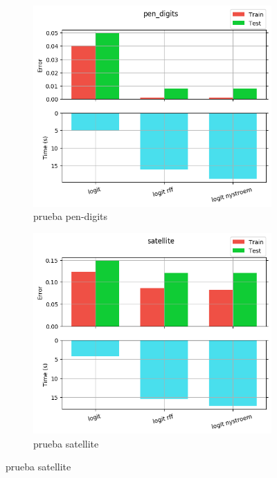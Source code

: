\begin{figure}[ht]
  \centering
  \begin{subfigure}[b]{0.5\linewidth}
    \centering\captionsetup{width=.8\linewidth}\includegraphics[width=\imgscale\linewidth]{Figures/2_1/pen_digits}
    \caption{prueba pen-digits}
    \label{fig:2_1_pen_digits}
  \end{subfigure}%
  \begin{subfigure}[b]{0.5\linewidth}
    \centering\captionsetup{width=.8\linewidth}\includegraphics[width=\imgscale\linewidth]{Figures/2_1/satellite}
    \caption{prueba satellite}
    \label{fig:2_1_satellite}
  \end{subfigure}
\end{figure}

